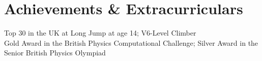 \section{Achievements \& Extracurriculars}
\begin{itemize}[leftmargin=0.15in, label={}]
\small{\item{
    {Top 30 in the UK at Long Jump at age 14; V6-Level Climber}\\
    {Gold Award in the British Physics Computational Challenge; Silver Award in the Senior British Physics Olympiad}
}}
\end{itemize}